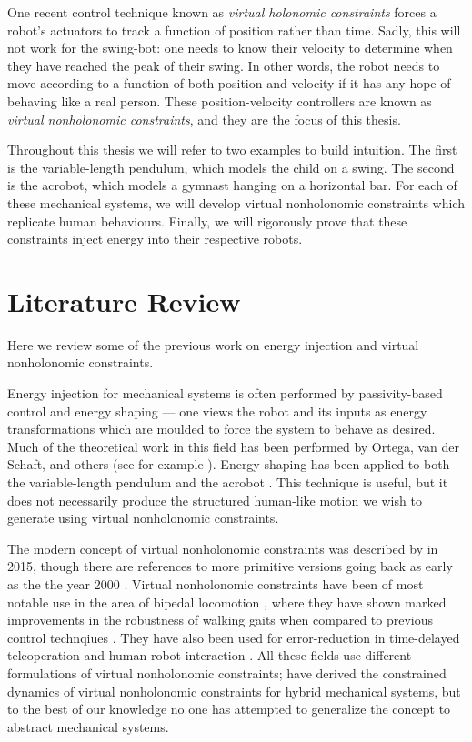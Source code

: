 One recent control technique known as \textit{virtual holonomic constraints}
\cite{vhcs_for_el_systems} forces a robot's actuators to track a function of
position rather than time.
Sadly, this will not work for the swing-bot: one needs to know their velocity to
determine when they have reached the peak of their swing.
In other words, the robot needs to move according to a function of both position
and velocity if it has any hope of behaving like a real person.
These position-velocity controllers are known as 
\textit{virtual nonholonomic constraints}, and they are the focus of this
thesis.

Throughout this thesis we will refer to two examples to build intuition.
The first is the variable-length pendulum, which models the child on a swing.
The second is the acrobot, which models a gymnast hanging on a horizontal bar.
For each of these mechanical systems, we will develop virtual nonholonomic
constraints which replicate human behaviours. 
Finally, we will rigorously prove that these constraints inject energy into
their respective robots.

\section{Literature Review}
Here we review some of the previous work on energy injection and virtual
nonholonomic constraints.

Energy injection for mechanical systems is often performed by passivity-based
control and energy shaping --- one views the robot and its inputs as energy
transformations which are moulded to force the system to behave as desired.
Much of the theoretical work in this field has been performed by Ortega, van der
Schaft, and others (see for example \cite{ida_pbc_underactuation_one,
ida_pbc_acrobot_example,energy_shaping_revisited}).
Energy shaping has been applied to both the variable-length
pendulum \cite{vlp_energy_shaping} and the acrobot
\cite{swingup_acrobot_energy,swingup_giant_acrobot}.
This technique is useful, but it does not necessarily produce the structured
human-like motion we wish to generate using virtual nonholonomic constraints.

The modern concept of virtual nonholonomic constraints was described by
\citet{nhvc_dynamic_walking} in 2015, though there are references to more
primitive versions going back as early as the the year 2000
\cite{vnhc_human_robot_cooperation}.
Virtual nonholonomic constraints have been of most notable use in the area of
bipedal locomotion \cite{nhvc_incline_walking,output_nhvc_bipedal_conrol},
where they have shown marked improvements in the robustness of walking gaits
when compared to previous control technqiues \cite{nhvc_incline_walking}.
They have also been used for error-reduction in time-delayed teleoperation
\cite{vnhc_time_delay_teleop} and human-robot interaction
\cite{psd_based_vnhc_redundant_manipulator,haptic_vnhc}.
All these fields use different formulations of virtual nonholonomic constraints;
\citet{hybrid_zero_dynamics_bipedal_nhvcs} have derived the constrained dynamics
of virtual nonholonomic constraints for hybrid mechanical systems,
but to the best of our knowledge no one has attempted to generalize the
concept to abstract mechanical systems.

